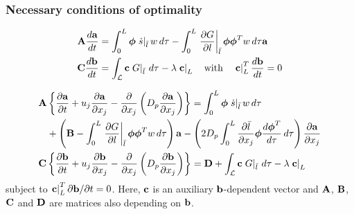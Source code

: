 \documentclass[10pt,xcolor=dvipsnames]{beamer}
\begin{document}
\begin{frame}[t]

  \frametitle{Necessary conditions of optimality}

  \begin{align*}
    {\mathbf A} \frac{d{\mathbf a}}{dt} &= \int_{0}^{L} {\boldsymbol \phi} \left.\dot{s}\right|_{\bar{l}} w \, d\tau
    - \int_{0}^{L} \left.\frac{\partial G}{\partial l}\right|_{\bar{l}} {\boldsymbol \phi} {\boldsymbol \phi}^T w \, d\tau {\mathbf a} \\
    {\mathbf C} \frac{d{\mathbf b}}{dt} &= \int_{{\mathcal L}} {\mathbf c} \left.G\right|_{\bar{l}} \, d\tau - \lambda \left.{\mathbf c}\right|_{L}
    \quad\text{with}\quad
    \left.{\mathbf c}\right|_{L}^T \frac{d{\mathbf b}}{dt} = 0
  \end{align*}

  \begin{align*}
    &\Abf \left\{\frac{\partial\abf}{\partial t} + u_j \frac{\partial\abf}{\partial x_j}
    - \frac{\partial}{\partial x_j} \left(D_p \frac{\partial\abf}{\partial x_j}\right) \right\}
    = \int_{0}^{L} \phibf \left.\dot{s}\right|_{\bar{l}} w \, d\tau \\
    &\phantom{\Abf}+ \left(\Bbf - \int_{0}^{L} \left.\frac{\partial G}{\partial l}\right|_{\bar{l}} \phibf \phibf^T w \, d\tau\right) \abf
    - \left(2 D_p \int_{0}^{L} \frac{\partial\bar{l}}{\partial x_j} \phibf \frac{d\phibf^T}{d\tau} \, d\tau\right) \frac{\partial\abf}{\partial x_j} \\
    &\Cbf \left\{\frac{\partial\bbf}{\partial t} + u_j \frac{\partial\bbf}{\partial x_j} - \frac{\partial}{\partial x_j}\left(D_p \frac{\partial\bbf}{\partial x_j}\right)\right\} =
    \Dbf + \int_{\Lcal} \cbf \left.G\right|_{\bar{l}} \, d\tau - \lambda \left.\cbf\right|_{L}
  \end{align*}
  subject to $\left.{\mathbf c}\right|_{L}^T \partial{\mathbf b}/\partial t = 0$. Here, ${\mathbf c}$ is an auxiliary ${\mathbf b}$-dependent vector and ${\mathbf A}$, ${\mathbf B}$, ${\mathbf C}$ and ${\mathbf D}$ are matrices also depending on ${\mathbf b}$.

\end{frame}

\end{document}
